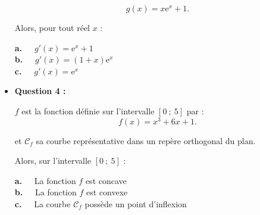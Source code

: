 \begin{itemize}
     \par
     \[ g(x)=x \text{e}^{x}+1. \]
     \par
     Alors, pour tout réel $x$ :
     \par
     \textbf{a.~~} $g'(x)=\text{e}^{x}+1$ \\
     \textbf{b.~~} $g'(x)=(1+x)\text{e}^{x}$  \\
     \textbf{c.~~} $g'(x)=\text{e}^{x}$ \\
\medskip
     \item \textbf{Question 4 :}
     \par
     $f$ est la fonction définie sur l'intervalle $[0~;~5]$ par :
     \[ f(x)=x^3+6x+1. \]
     \par
     et $\mathscr{C}_f$ sa courbe représentative dans un repère orthogonal du plan.
     \par
     Alors, sur l'intervalle $[0~;~5]$  :
     \par
     \textbf{a.~~} La fonction $f$ est concave \\
     \textbf{b.~~} La fonction $f$ est convexe \\
     \textbf{c.~~} La courbe $\mathscr{C}_f$ possède un point d'inflexion \\
     \par
\end{itemize}
